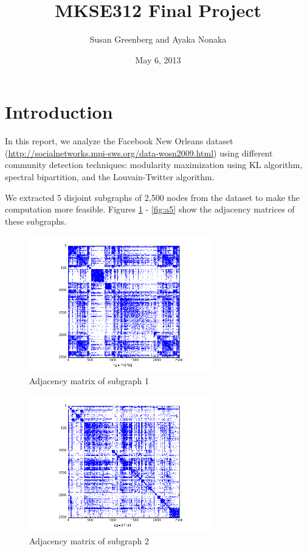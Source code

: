 \documentclass[11pt]{article}
\date{May 6, 2013}
\title{
MKSE312 Final Project
}
\author{
Susan Greenberg and Ayaka Nonaka
}
\begin{document}
\maketitle

\section{Introduction}
In this report, we analyze the Facebook New Orleans dataset (\url{http://socialnetworks.mpi-sws.org/data-wosn2009.html}) using different community detection techniques: modularity maximization using KL algorithm, spectral bipartition, and the Louvain-Twitter algorithm.

We extracted 5 disjoint subgraphs of 2,500 nodes from the dataset to make the computation more feasible. Figures \ref{fig:a1} - \ref{fig:a5} show the adjacency matrices of these subgraphs.

		 \begin{figure}
		 		\begin{center}
		  		\includegraphics[width=300px]{../graphs/a1.png}
		  	\end{center}
		  	\caption{Adjacency matrix of subgraph 1}
		  	\label{fig:a1}
		 \end{figure}

		\begin{figure}
				\begin{center}
		 		\includegraphics[width=300px]{../graphs/a2.png}
		 	\end{center}
		 	\caption{Adjacency matrix of subgraph 2}
		 	\label{fig:a2}
		\end{figure}
\end{document}

